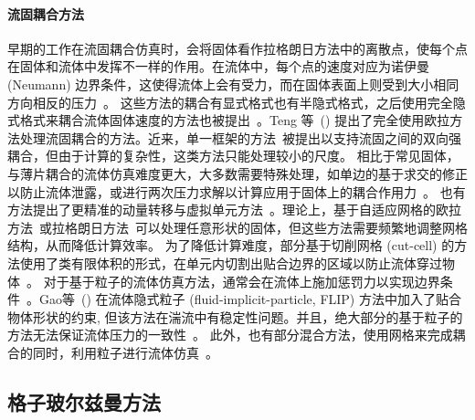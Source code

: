 \paragraph{流固耦合方法}
早期的工作在流固耦合仿真时，会将固体看作拉格朗日方法中的离散点，使每个点在固体和流体中发挥不一样的作用。在流体中，每个点的速度对应为诺伊曼 (Neumann) 边界条件，这使得流体上会有受力，而在固体表面上则受到大小相同方向相反的压力~\cite{Carlson-2004,Genevaux-2003,Takahashi-2002,Foster:2001,Yngve:2000}。
这些方法的耦合有显式格式也有半隐式格式，之后使用完全隐式格式来耦合流体固体速度的方法也被提出~\cite{Klingner-2006,Chentanez:2006:SCP,Batty-2007}。Teng 等~(\citeyear{Teng-2016}) 提出了完全使用欧拉方法处理流固耦合的方法。近来，单一框架的方法~\cite{takahashi-2020,fang-2020}被提出以支持流固之间的双向强耦合，但由于计算的复杂性，这类方法只能处理较小的尺度。
相比于常见固体，与薄片耦合的流体仿真难度更大，大多数需要特殊处理，如单边的基于求交的修正以防止流体泄露，或进行两次压力求解以计算应用于固体上的耦合作用力~\cite{Guendelman-2005}。
也有方法提出了更精准的动量转移与虚拟单元方法~\cite{Robinson:2009, Robinson-2008}。理论上，基于自适应网格的欧拉方法~\cite{Elcott-2007,Klingner-2006,Feldman:DF:2005,Feldman-2005,dai-2005}或拉格朗日方法~\cite{Clausen-2013,Misztal:2010}可以处理任意形状的固体，但这些方法需要频繁地调整网格结构，从而降低计算效率。
为了降低计算难度，部分基于切削网格 (cut-cell) 的方法使用了类有限体积的形式，在单元内切割出贴合边界的区域以防止流体穿过物体~\cite{Azevedo-2016,Liu:2015:MVF,weber-2015,Edwards-2014,gibou-2012,Ng-2009,Batty-2007,Roble-2005}。
对于基于粒子的流体仿真方法，通常会在流体上施加惩罚力以实现边界条件~\cite{peer-2015,Ihmsen-2013}。Gao等~(\citeyear{Gao:2017}) 在流体隐式粒子 (fluid-implicit-particle, FLIP) 方法中加入了贴合物体形状的约束, 但该方法在湍流中有稳定性问题。并且，绝大部分的基于粒子的方法无法保证流体压力的一致性~\cite{band-2018}。
此外，也有部分混合方法，使用网格来完成耦合的同时，利用粒子进行流体仿真~\cite{Fei-2019,Fei-2018,hu-2018,Zhang-2016}。

\subsection{格子玻尔兹曼方法}
\label{sec:1_related_works_LBM}
